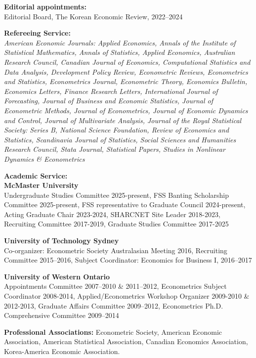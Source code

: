 \documentclass[12pt]{article}
\begin{document}
\begin{description}
\item \hspace{0.2in}\textbf{Editorial appointments:}\\
\hspace{0.6in}
Editorial Board, The Korean Economic Review, \hfill 2022--2024

\item \hspace{0.2in}\textbf{Refereeing Service:}\\
\hspace{0.6in}
\textit{
American Economic Journals: Applied Economics,
Annals of the Institute of Statistical Mathematics,
Annals of Statistics,
Applied Economics,
Australian Research Council,
Canadian Journal of Economics,
Computational Statistics and Data Analysis,
Development Policy Review,
Econometric Reviews,
Econometrics and Statistics,
Econometrics Journal,
Econometric Theory,
Economics Bulletin,
Economics Letters,
Finance Research Letters,
International Journal of Forecasting,
Journal of Business and Economic Statistics,
Journal of Econometric Methods,
Journal of Econometrics,
Journal of Economic Dynamics and Control,
Journal of Multivariate Analysis,
Journal of the Royal Statistical Society: Series B,
National Science Foundation,
Review of Economics and Statistics,
Scandinavia Journal of Statistics,
Social Sciences and Humanities Research Council,
Stata Journal,
Statistical Papers,
Studies in Nonlinear Dynamics \& Econometrics
}

\item \hspace{0.2in}\textbf{Academic Service:}\\
\textbf{McMaster University}\\
Undergraduate Studies Committee 2025-present,
FSS Banting Scholarship Committee 2025-present,
FSS representative to Graduate Council 2024-present,
Acting Graduate Chair 2023-2024,
SHARCNET Site Leader 2018-2023,
Recruiting Committee 2017-2019,
Graduate Studies Committee 2017-2025

\textbf{University of Technology Sydney}\\
Co-organizer: Econometric
Society Australasian Meeting 2016, Recruiting Committee 2015--2016, Subject Coordinator: Economics for Business I,
2016--2017

\textbf{University of Western Ontario}\\
Appointments Committee 2007--2010 \& 2011--2012, Econometrics Subject Coordinator 2008-2014, Applied/Econometrics Workshop Organizer 2009-2010 \& 2012-2013, Graduate Affairs Committee 2009--2012, Econometrics Ph.D. Comprehensive Committee 2009--2014

\item \hspace{0.2in}\textbf{Professional Associations:}
Econometric Society,
American Economic Association,
American Statistical Association,
Canadian Economics Association,
Korea-America Economic Association.
\end{description}
\end{document}

